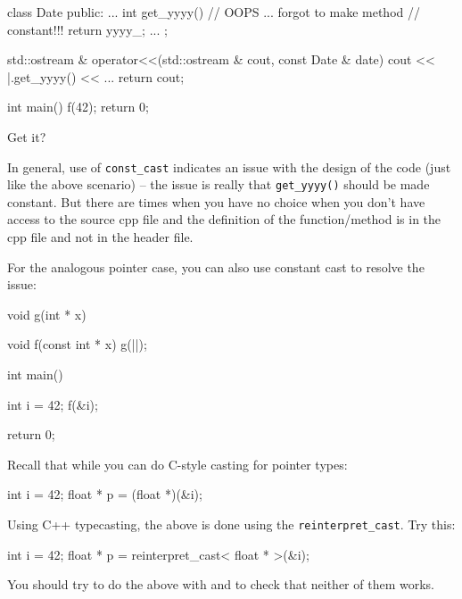 \begin{consolethree}[escapeinside=||]
\begin{ex}
\begin{consolethree}[escapeinside=||]
class Date
{
public:
     ...
     int get_yyyy() // OOPS ... forgot to make method
                    // constant!!!
     {    
          return yyyy_;
     }
     ...
};

std::ostream & operator<<(std::ostream & cout,
                          const Date & date)
{    
     cout << |.get\_yyyy()
          << ...
          return cout;
}

int main()
{   
    f(42);
    return 0;
}
\end{consolethree}

Get it?
\end{ex}

In general, use of \texttt{const\_cast} indicates an issue with the design
of the code (just like the above scenario) -- the issue is really that
\texttt{get\_yyyy()} should be made constant. But there are times when you
have no choice when you don't have access to the source cpp file and the
definition of the function/method is in the cpp file and not in the
header file.

For the analogous pointer case, you can also use constant cast to
resolve the issue:

\begin{consolethree}[escapeinside=||]
void g(int * x)
{}

void f(const int * x)
{    
     g(|\EMPHASIZE{}|);
}

int main()
{   
    int i = 42;
    f(&i);

    return 0;
}
\end{consolethree}

\newpage{}

Recall that while you can do C-style casting for pointer types:

\begin{console}
int i = 42;
float * p = (float *)(&i);
\end{console}

Using C++ typecasting, the above is done using the \texttt{reinterpret\_cast}. Try this:

\begin{console}
int i = 42;
float * p = reinterpret_cast< float * >(&i);
\end{console}

You should try to do the above with \texttt{} and \texttt{} to check that neither of them works.


\end{consolethree}
